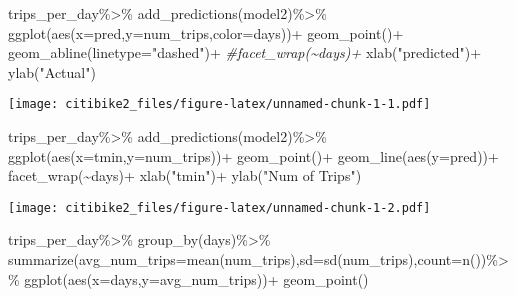 \documentclass[
]{article}
\newenvironment{Shaded}{\begin{snugshade}}{\end{snugshade}}
\newcommand{\AttributeTok}[1]{\textcolor[rgb]{0.77,0.63,0.00}{#1}}
\newcommand{\CommentTok}[1]{\textcolor[rgb]{0.56,0.35,0.01}{\textit{#1}}}
\newcommand{\FunctionTok}[1]{\textcolor[rgb]{0.00,0.00,0.00}{#1}}
\newcommand{\NormalTok}[1]{#1}
\newcommand{\SpecialCharTok}[1]{\textcolor[rgb]{0.00,0.00,0.00}{#1}}
\newcommand{\StringTok}[1]{\textcolor[rgb]{0.31,0.60,0.02}{#1}}
\begin{document}
\begin{Shaded}
\begin{Highlighting}[]
\NormalTok{trips\_per\_day}\SpecialCharTok{\%\textgreater{}\%}
  \FunctionTok{add\_predictions}\NormalTok{(model2)}\SpecialCharTok{\%\textgreater{}\%}
  \FunctionTok{ggplot}\NormalTok{(}\FunctionTok{aes}\NormalTok{(}\AttributeTok{x=}\NormalTok{pred,}\AttributeTok{y=}\NormalTok{num\_trips,}\AttributeTok{color=}\NormalTok{days))}\SpecialCharTok{+}
  \FunctionTok{geom\_point}\NormalTok{()}\SpecialCharTok{+}
  \FunctionTok{geom\_abline}\NormalTok{(}\AttributeTok{linetype=}\StringTok{"dashed"}\NormalTok{)}\SpecialCharTok{+}
  \CommentTok{\#facet\_wrap(\textasciitilde{}days)+}
  \FunctionTok{xlab}\NormalTok{(}\StringTok{"predicted"}\NormalTok{)}\SpecialCharTok{+}
  \FunctionTok{ylab}\NormalTok{(}\StringTok{"Actual"}\NormalTok{)}
\end{Highlighting}
\end{Shaded}

\texttt{[image: citibike2\_files/figure-latex/unnamed-chunk-1-1.pdf]}

\begin{Shaded}
\begin{Highlighting}[]
\NormalTok{trips\_per\_day}\SpecialCharTok{\%\textgreater{}\%}
  \FunctionTok{add\_predictions}\NormalTok{(model2)}\SpecialCharTok{\%\textgreater{}\%}
  \FunctionTok{ggplot}\NormalTok{(}\FunctionTok{aes}\NormalTok{(}\AttributeTok{x=}\NormalTok{tmin,}\AttributeTok{y=}\NormalTok{num\_trips))}\SpecialCharTok{+}
  \FunctionTok{geom\_point}\NormalTok{()}\SpecialCharTok{+}
  \FunctionTok{geom\_line}\NormalTok{(}\FunctionTok{aes}\NormalTok{(}\AttributeTok{y=}\NormalTok{pred))}\SpecialCharTok{+}
  \FunctionTok{facet\_wrap}\NormalTok{(}\SpecialCharTok{\textasciitilde{}}\NormalTok{days)}\SpecialCharTok{+}
  \FunctionTok{xlab}\NormalTok{(}\StringTok{"tmin"}\NormalTok{)}\SpecialCharTok{+}
  \FunctionTok{ylab}\NormalTok{(}\StringTok{"Num of Trips"}\NormalTok{)}
\end{Highlighting}
\end{Shaded}

\texttt{[image: citibike2\_files/figure-latex/unnamed-chunk-1-2.pdf]}

\begin{Shaded}
\begin{Highlighting}[]
\NormalTok{trips\_per\_day}\SpecialCharTok{\%\textgreater{}\%}
  \FunctionTok{group\_by}\NormalTok{(days)}\SpecialCharTok{\%\textgreater{}\%}
  \FunctionTok{summarize}\NormalTok{(}\AttributeTok{avg\_num\_trips=}\FunctionTok{mean}\NormalTok{(num\_trips),}\AttributeTok{sd=}\FunctionTok{sd}\NormalTok{(num\_trips),}\AttributeTok{count=}\FunctionTok{n}\NormalTok{())}\SpecialCharTok{\%\textgreater{}\%}
  \FunctionTok{ggplot}\NormalTok{(}\FunctionTok{aes}\NormalTok{(}\AttributeTok{x=}\NormalTok{days,}\AttributeTok{y=}\NormalTok{avg\_num\_trips))}\SpecialCharTok{+}
  \FunctionTok{geom\_point}\NormalTok{()}
\end{Highlighting}
\end{Shaded}
\end{document}
